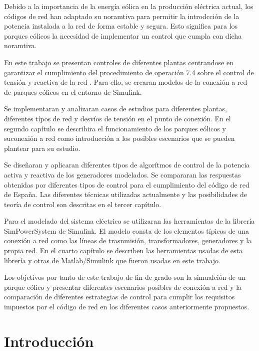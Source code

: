 \documentclass{book}
\begin{document}
Debido a la importancia de la energ\'ia e\'olica en la producci\'on el\'ectrica actual, los c\'odigos de red han adaptado su noramtiva para permitir la introdcci\'on de la potencia instalada a la red de forma estable y segura. Esto significa para los parques e\'olicos la necesidad de implementar un control que cumpla con dicha noramtiva. \par
En este trabajo se presentan controles de diferentes plantas centrandose en garantizar el cumplimiento del procedimiento de operaci\'on 7.4 sobre el control de tensi\'on y reactiva de la red \cite{PO74}. Para ello, se crearan modelos de la conexi\'on a red de parques e\'olicos en el entorno de Simulink. \par
Se implementaran y analizaran casos de estudios para diferentes plantas, diferentes t\'ipos de red y desv\'ios de tensi\'on en el punto de conexi\'on. En el segundo cap\'itulo se describira el funcionamiento de los parques e\'olicos y suconexi\'on a red como introducci\'on a los posibles escenarios que se pueden plantear para su estudio. \par
Se diseñaran y aplicaran diferentes tipos de algor\'itmos de control de la potencia activa y reactiva de los generadores modelados. Se compararan las respuestas obtenidas por diferentes tipos de control para el cumplimiento del c\'odigo de red de España. Las diferentes t\'ecnicas utilizadas actualmente y las posibilidades de teor\'ia de control son descritas en el tercer cap\'itulo. \par
Para el modelado del sistema el\'ectrico se utilizaran las herramientas de la librer\'ia SimPowerSystem de Simulink. El modelo consta de los elementos t\'ipicos de una conexi\'on a red como las l\'ineas de trasnmisi\'on, transformadores, generadores y la propia red. En el cuarto cap\'itulo se describen las herramientas usadas de esta librer\'ia y otras de Matlab/Simulink que fueron usadas en este trabajo. \par
Los objetivos por tanto de este trabajo de fin de grado son la simualci\'on de un parque e\'olico y presentar diferentes escenarios posibles de conexi\'on a red y la comparaci\'on de diferentes estrategias de control para cumplir los requisitos impuestos por el c\'odigo de red en los diferentes casos anteriormente propuestos. \par

\tableofcontents %

\chapter{Introducci\'on}
\end{document}
